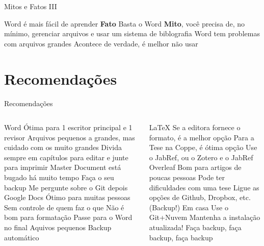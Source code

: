 \documentclass{beamer}
\begin{document}
\begin{frame}{Mitos e Fatos III }
    \begin{outline}
        \1 Word é mais fácil de aprender
        \2 \textbf{Fato}
        \1 Basta o Word
        \2 \textbf{Mito}, você precisa de, no mínimo, gerenciar arquivos e usar um sistema de biblografia
        \1 Word tem problemas com arquivos grandes
        \2 Acontece de verdade, é melhor não usar 
    \end{outline}
\end{frame}

\section{Recomendações}
\begin{frame}[shrink=20]{Recomendações}
    \begin{columns}
        \begin{column}{0.5\linewidth}
            \begin{outline}
                \1 Word
                    \2 Ótima para 1 escritor principal e 1 revisor
                    \2 Arquivos pequenos a grandes, mas cuidado com os muito grandes
                        \3 Divida sempre em capítulos para editar e junte para imprimir
                        \3 Master Document está bugado há muito tempo
                    \2 Faça o seu backup
                        \3 Me pergunte sobre o Git depois
                \1 Google Docs
                    \2 Ótimo para muitas pessoas
                    \2 Sem controle de quem faz o que
                    \2 Não é bom para formatação 
                        \3 Passe para o Word no final
                    \2 Aquivos pequenos
                        \3 Backup automático     
           \end{outline}     
        \end{column}
        \begin{column}{0.5\linewidth}
            \begin{outline}
            \1 \LaTeX
                \2 Se a editora fornece o formato, é a melhor opção
                \2 Para a Tese na Coppe, é ótima opção
                    \3 Use o JabRef, ou o Zotero e o JabRef
                \2 Overleaf
                    \3 Bom para artigos de poucas pessoas
                    \3 Pode ter dificuldades com uma tese
                    \3 Ligue as opções de Github, Dropbox, etc. (Backup!)
                \2 Em casa
                    \3 Use o Git+Nuvem
                    \3 Mantenha a instalação atualizada!
                    \3 Faça backup, faça backup, faça backup
                \end{outline}
        \end{column}
    \end{columns}
\end{frame}
\end{document}
